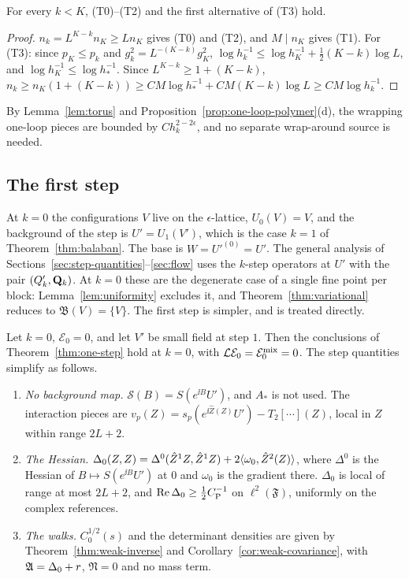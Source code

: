 \begin{lemma}\label{lem:torus}
For every $k<K$, (T0)--(T2) and the first alternative of (T3) hold.
\end{lemma}

\begin{proof}
$n_k=L^{K-k}n_K\ge Ln_K$ gives (T0) and (T2), and $M\mid n_K$ gives (T1). For (T3): since $p_K\le p_k$ and $g_k^2=L^{-(K-k)}g_K^2$, $\log h_k^{-1}\le\log h_K^{-1}+\frac12(K-k)\log L$, and $\log h_K^{-1}\le\log h_*^{-1}$. Since $L^{K-k}\ge1+(K-k)$, $n_k\ge n_K(1+(K-k))\ge CM\log h_*^{-1}+CM(K-k)\log L\ge CM\log h_k^{-1}$.
\end{proof}

By Lemma~\ref{lem:torus} and Proposition~\ref{prop:one-loop-polymer}(d), the wrapping one-loop pieces are bounded by $Ch_k^{2-2\epsilon}$, and no separate wrap-around source is needed.

\subsection{The first step}\label{subsec:tf-first}

At $k=0$ the configurations $V$ live on the $\epsilon$-lattice, $U_0(V)=V$, and the background of the step is $U'=U_1(V')$, which is the case $k=1$ of Theorem~\ref{thm:balaban}. The base is $W=U'^{(0)}=U'$. The general analysis of Sections~\ref{sec:step-quantities}--\ref{sec:flow} uses the $k$-step operators at $U'$ with the pair $(Q'_k,\mathbf Q_k)$. At $k=0$ these are the degenerate case of a single fine point per block: Lemma~\ref{lem:uniformity} excludes it, and Theorem~\ref{thm:variational} reduces to $\mathfrak B(V)=\{V\}$. The first step is simpler, and is treated directly.

\begin{proposition}\label{prop:first-step}
Let $k=0$, $\mathcal E_0=0$, and let $V'$ be small field at step $1$. Then the conclusions of Theorem~\ref{thm:one-step} hold at $k=0$, with $\mathcal L\mathcal E_0=\mathcal E^{\rm mix}_0=0$. The step quantities simplify as follows.
\begin{enumerate}[label=(\alph*)]
\item \emph{No background map.} $\mathcal S(B)=S(e^{\ii B}U')$, and $A_*$ is not used. The interaction pieces are $v_p(Z)=s_p(e^{\ii\hat Z(Z)}U')-T_2[\cdots](Z)$, local in $Z$ within range $2L+2$.
\item \emph{The Hessian.} $\Delta_0(Z,Z)=\Delta^0(\hat Z^1Z,\hat Z^1Z)+2\langle \omega_0,\hat Z^2(Z)\rangle$, where $\Delta^0$ is the Hessian of $B\mapsto S(e^{\ii B}U')$ at $0$ and $\omega_0$ is the gradient there. $\Delta_0$ is local of range at most $2L+2$, and $\operatorname{Re}\Delta_0\ge\frac12C_{\rm P}^{-1}$ on $\ell^2(\mathfrak F)$, uniformly on the complex references.
\item \emph{The walks.} $C_0^{1/2}(s)$ and the determinant densities are given by Theorem~\ref{thm:weak-inverse} and Corollary~\ref{cor:weak-covariance}, with $\mathfrak A=\Delta_0+r$, $\mathfrak N=0$ and no mass term.
\end{enumerate}
\end{proposition}

